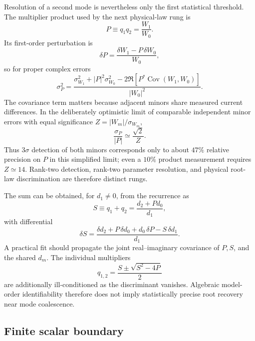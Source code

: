\documentclass[11pt]{article}
\begin{document}
Resolution of a second mode is nevertheless only the first statistical threshold.  The multiplier product used by the next physical-law rung is
\begin{equation}
P\equiv q_1q_2=\frac{W_1}{W_0}.
\label{eq:rank2_product_estimator}
\end{equation}
Its first-order perturbation is
\begin{equation}
\boxed{\delta P=\frac{\delta W_1-P\,\delta W_0}{W_0},}
\label{eq:rank2_product_delta}
\end{equation}
so for proper complex errors
\begin{equation}
\boxed{
\sigma_P^2=\frac{\sigma_{W_1}^2+|P|^2\sigma_{W_0}^2-2\Re\!\left[P^*\operatorname{Cov}(W_1,W_0)\right]}{|W_0|^2}.}
\label{eq:rank2_product_cov}
\end{equation}
The covariance term matters because adjacent minors share measured current differences.  In the deliberately optimistic limit of comparable independent minor errors with equal significance $Z=|W_m|/\sigma_{W_m}$,
\begin{equation}
\frac{\sigma_P}{|P|}\simeq\frac{\sqrt2}{Z}.
\end{equation}
Thus $3\sigma$ detection of both minors corresponds only to about $47\%$ relative precision on $P$ in this simplified limit; even a $10\%$ product measurement requires $Z\simeq14$.  Rank-two detection, rank-two parameter resolution, and physical root-law discrimination are therefore distinct rungs.

The sum can be obtained, for $d_1\neq0$, from the recurrence as
\begin{equation}
S\equiv q_1+q_2=\frac{d_2+P d_0}{d_1},
\end{equation}
with differential
\begin{equation}
\boxed{\delta S=\frac{\delta d_2+P\,\delta d_0+d_0\,\delta P-S\,\delta d_1}{d_1}.}
\label{eq:rank2_sum_delta}
\end{equation}
A practical fit should propagate the joint real--imaginary covariance of $P,S$, and the shared $d_m$.  The individual multipliers
\begin{equation}
q_{1,2}=\frac{S\pm\sqrt{S^2-4P}}{2}
\end{equation}
are additionally ill-conditioned as the discriminant vanishes.  Algebraic model-order identifiability therefore does not imply statistically precise root recovery near mode coalescence.

\subsection{Finite scalar boundary}
\end{document}
